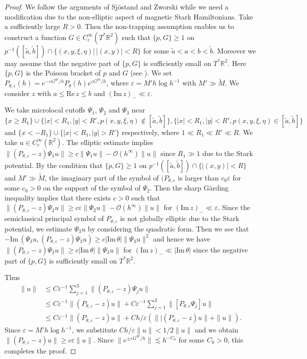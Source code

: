 \documentclass{article}
\theoremstyle{plain}
\theoremstyle{definition}
\theoremstyle{remark}
\newcommand{\RR}{\mathbb{R}}
\newcommand{\Cinf}{C^{\infty}}
\newcommand{\ve}{\varepsilon}
\newcommand{\RE}{\mathrm{Re}\,}
\newcommand{\IM}{\mathrm{Im}\,}
\begin{document}
\begin{proof}
We follow the arguments of Sj\"{o}stand and Zworski \cite[Theorem 1]{SZ} 
while we need a modification due to the non-elliptic aspect of magnetic Stark Hamiltonians.
Take a sufficiently large $R>0$. 
Then the non-trapping assumption enables us to construct a function $G\in \Cinf_c(T^*\RR^2)$ 
such that $\{p, G\}\ge 1$ on $p^{-1}([\widetilde{a}, \widetilde{b}])\cap 
\{(x, y, \xi, \eta)|\,|(x, y)|<R\}$ 
for some $\widetilde{a}<a<b<\widetilde{b}$. 
Moreover we may assume that the negative part of $\{p, G\}$ is sufficiently small on $T^*\RR^2$.  
Here $\{p, G\}$ is the Poisson bracket of $p$ and $G$ 
(see \cite[subsection~4.2]{SZ}). 
We set $P_{\theta, \ve}(h)=e^{-\ve G^W/h}P_{\theta}(h)e^{\ve G^W/h}$, 
where $\ve=M'h\log h^{-1}$ with $M'\gg \widetilde{M}$. 
We consider $z$ with $a\le \RE z \le b$ and $(\IM z)_-\ll \ve$.  

We take microlocal cutoffs $\Psi_1$, $\Psi_2$ and $\Psi_3$ near 
$\{x \ge R_1\}\cup \{|x|<R_1, |y|<R', p(x, y, \xi, \eta) \not \in [\widetilde{a}, \widetilde{b}]\}, 
\{|x|<R_1, |y|<R',  p(x, y, \xi, \eta) \in [\widetilde{a}, \widetilde{b}]\}$ and 
$\{x<-R_1\}\cup \{|x|<R_1, |y|>R'\}$ respectively, where $1\ll R_1 \ll R' \ll R$.  
We take $u\in \Cinf_c(\RR^2)$. 
The elliptic estimate implies 
$\|(P_{\theta, \ve}-z)\Psi_1 u\|\ge c\|\Psi_1 u\|-\mathcal{O}(h^{\infty})\|u\|$ 
since $R_1\gg 1$ due to the Stark potential. 
By the condition that $\{p, G\}\ge 1$ on $p^{-1}([\widetilde{a}, \widetilde{b}])\cap \{|(x, y)|<R\}$ and 
$M'\gg \widetilde{M}$, the imaginary part of the symbol of $(P_{\theta, \ve}$ is larger than 
$c_0\ve$ for some $c_0>0$ on the support of the symbol of $\Psi_2 $. 
Then the sharp G\r{a}rding inequality implies that there exists $c>0$ such that 
$\|(P_{\theta, \ve}-z)\Psi_2 u\|
\ge c\ve\|\Psi_2 u\|-\mathcal{O}(h^{\infty})\|u\|$ 
for $(\IM z)_-\ll \ve$.   
Since the semiclassical principal symbol of $P_{\theta, \ve}$ is not globally elliptic due to the Stark potential, 
we estimate $\Psi_3 u$ by considering the quadratic form. 
Then we see that
$-\IM (\Psi_3 u, (P_{\theta, \ve}-z)\Psi_3 u) \ge c|\IM\theta| \|\Psi_3 u\|^2$ 
and hence we have 
$\|(P_{\theta, \ve}-z)\Psi_3 u\| \ge c|\IM\theta| \|\Psi_3 u\|$
for $(\IM z)_-\ll |\IM\theta|$ 
since the negative part of $\{p, G\}$ is sufficiently small on $T^*\RR^2$. 
 
Thus 
\begin{align*}
\|u\|
&\le C\ve^{-1}\sum_{j=1}^3 \|(P_{\theta, \ve}-z)\Psi_j u\| \\
&\le C\ve^{-1} \|(P_{\theta, \ve}-z)u\|+C\ve^{-1} \sum_{j=1}^3 \|[P_{\theta, \ve}\Psi_j] u\| \\
&\le C\ve^{-1} \|(P_{\theta, \ve}-z)u\|+Ch/{\ve}(\||(P_{\theta, \ve}-z)u\|+\|u\|).
\end{align*}
Since $\ve=M'h\log h^{-1}$, we substitute $Ch/{\ve}\|u\|<1/2\|u\|$ and 
we obtain $\|(P_{\theta, \ve}-z)u\|\ge c\ve \| u\|$.
Since $\|e^{\pm\ve G^W/h}\|\lesssim h^{-C_0}$ for some $C_0>0$, this completes the proof. 
\end{proof}
\end{document}
